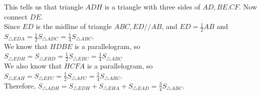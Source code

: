 \documentclass{article}
\begin{document}
This tells us that triangle \(A D H\) is a triangle with three sides of \(A D, B E . C F\). Now connect \(D E\).\\
Since \(E D\) is the midline of triangle \(A B C, E D / / A B\), and \(E D=\frac{1}{2} A B\) and \(S_{\triangle E D A}=\frac{1}{2} S_{\triangle A D C}=\frac{1}{4} S_{\triangle A B C}\).\\
We know that \(H D B E\) is a parallelogram, so \(S_{\triangle E D H}=S_{\triangle E B D}=\frac{1}{2} S_{\triangle E B C}=\frac{1}{4} S_{\triangle A B C}\)\\
We also know that \(H C F A\) is a parallelogram, so\\
\(S_{\triangle E A H}=S_{\triangle E F C}=\frac{1}{2} S_{\triangle A F C}=\frac{1}{4} S_{\triangle A B C}\).\\
Therefore, \(S_{\triangle A D H}=S_{\triangle E D H}+S_{\triangle E H A}+S_{\triangle E A D}=\frac{3}{4} S_{\triangle A B C}\).\\
\end{document}

